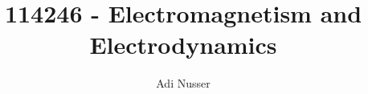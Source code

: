 \documentclass[]{article}
\title{114246 - Electromagnetism and Electrodynamics}
\author{Adi Nusser}
\begin{document}
\maketitle

\begin{abstract}

\end{abstract}














\end{document}
